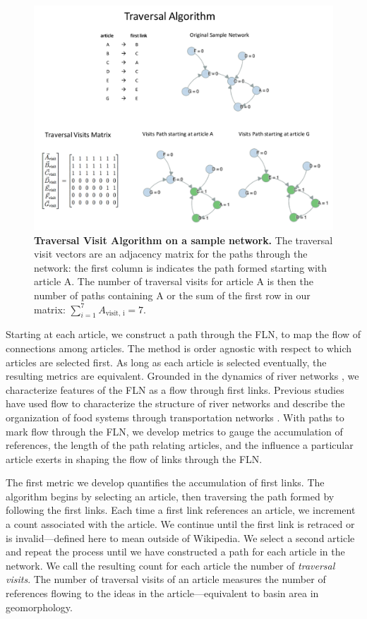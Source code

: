 \documentclass[11pt]{report}
\begin{document}
\begin{figure}[tp!]
  \includegraphics[width=\textwidth]{graphics/traversal_visit_algo_figure.pdf}  
  \caption{
    \textbf{Traversal Visit Algorithm on a sample network.}
     The traversal visit vectors are an adjacency matrix for the paths through the network: the first column is indicates the path formed starting with article A. The number of traversal visits for article A is then the number of paths containing A or the sum of the first row in our matrix:
     $\sum_{i=1}^7 A_{\text{visit, i}} = 7$.
  }
  \label{fig:Traversal Visits}
\end{figure}

Starting at each article, we construct a path through the FLN, 
to map the flow of connections among articles.
The method is order agnostic with respect to which articles are selected first. As long as each article is selected eventually, the resulting metrics are equivalent.
Grounded in the dynamics of river networks
\cite{geo_basins},
we characterize features of the FLN as a flow through first links.
Previous studies have used flow to characterize the structure of river networks
\cite{dodds} and describe the organization of food systems through transportation networks
\cite{food_webs}.
With paths to mark flow through the FLN, we develop metrics to 
gauge the accumulation of references, 
the length of the path relating articles, and the influence a particular
article exerts in shaping the flow of links through the FLN.


The first metric we develop quantifies the accumulation of first links.
The algorithm begins by selecting an article, then traversing the path formed
by following the first links. Each time a first link references an article, we increment a count
associated with the article. 
We continue until the first link is retraced or is invalid---defined here to mean outside of Wikipedia.
We select a second article and repeat the process until we have 
constructed a path for each article in the network. We call the resulting count for each article the number of {\it traversal visits}. The number of traversal visits of an article 
measures the number of references flowing to the ideas in the article---equivalent
to basin area in geomorphology. 
\end{document}
